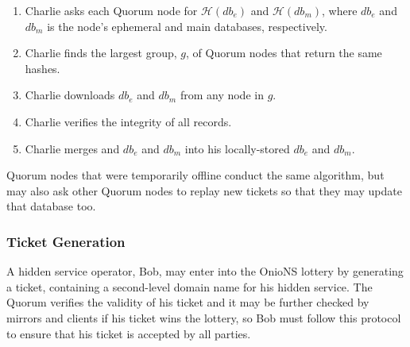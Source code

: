 \documentclass[USenglish,oneside,twocolumn]{article}
\begin{document}
\begin{enumerate}
	\item Charlie asks each Quorum node for $ \mathcal{H}(\mathit{db}_{e}) $ and $ \mathcal{H}(\mathit{db}_{m}) $, where $ \mathit{db}_{e} $ and $ \mathit{db}_{m} $ is the node's ephemeral and main databases, respectively.
	\item Charlie finds the largest group, $ g $, of Quorum nodes that return the same hashes.
	\item Charlie downloads $ \mathit{db}_{e} $ and $ \mathit{db}_{m} $ from any node in $ g $.
	\item Charlie verifies the integrity of all records.
	\item Charlie merges and $ \mathit{db}_{e} $ and $ \mathit{db}_{m} $ into his locally-stored $ \mathit{db}_{e} $ and $ \mathit{db}_{m} $.
\end{enumerate}

Quorum nodes that were temporarily offline conduct the same algorithm, but may also ask other Quorum nodes to replay new tickets so that they may update that database too. %


\subsubsection{Ticket Generation}
\label{sec:ticketGeneration}

A hidden service operator, Bob, may enter into the OnioNS lottery by generating a ticket, containing a second-level domain name for his hidden service. The Quorum verifies the validity of his ticket and it may be further checked by mirrors and clients if his ticket wins the lottery, so Bob must follow this protocol to ensure that his ticket is accepted by all parties.
\end{document}
